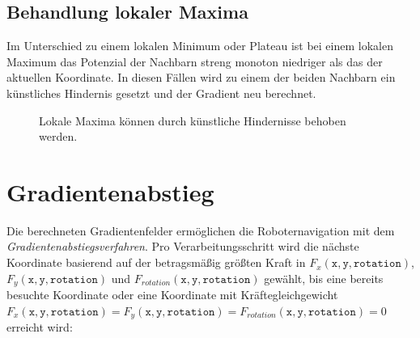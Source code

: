 \subsection{Behandlung lokaler Maxima}

Im Unterschied zu einem lokalen Minimum oder Plateau ist bei einem lokalen Maximum das Potenzial der Nachbarn streng monoton niedriger als das der aktuellen Koordinate.
In diesen Fällen wird zu einem der beiden Nachbarn ein künstliches Hindernis gesetzt und der Gradient neu berechnet.
\begin{figure}[H]
	\centering
	\footnotesize
	\centerline{\resizebox{0.9\linewidth}{!}{}}
	\caption{Lokale Maxima können durch künstliche Hindernisse behoben werden.}
\end{figure}


\section{Gradientenabstieg}

Die berechneten Gradientenfelder ermöglichen die Roboternavigation mit dem \textit{Gradientenabstiegsverfahren}. Pro Verarbeitungsschritt wird die nächste Koordinate basierend auf der betragsmäßig größten Kraft in $F_{x}(\texttt{x}, \texttt{y}, \texttt{rotation})$, $F_{y}(\texttt{x}, \texttt{y}, \texttt{rotation})$ und $F_{rotation}(\texttt{x}, \texttt{y}, \texttt{rotation})$ gewählt, bis eine bereits besuchte Koordinate oder eine Koordinate mit Kräftegleichgewicht $F_{x}(\texttt{x}, \texttt{y}, \texttt{rotation}) = F_{y}(\texttt{x}, \texttt{y}, \texttt{rotation}) = F_{rotation}(\texttt{x}, \texttt{y}, \texttt{rotation}) = 0$ erreicht wird:

